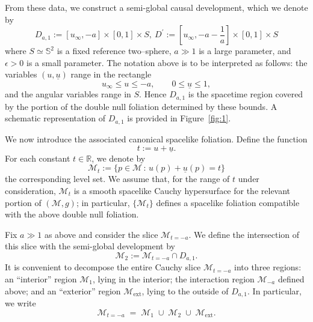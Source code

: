 \documentclass{amsart}
\newcommand{\ubar}{\underline{u}}
\begin{document}
\medskip

\noindent From these data, we construct a semi-global causal development, which we denote by
\[
D_{a,1} := [u_\infty,-a] \times [0,1] \times S,~D^{'}:=[u_{\infty},-a-\frac{1}{a}]\times [0,1]\times S
\]
where $S \simeq \mathbb{S}^2$ is a fixed reference two--sphere, $a \gg 1$ is a large parameter, and $\epsilon>0$ is a small parameter. 
The notation above is to be interpreted as follows: the variables $(u,\ubar)$ range in the rectangle
\[
u_\infty \le u \le -a,
\qquad
0 \le \ubar \le 1,
\]
and the angular variables range in $S$. 
Hence $D_{a,1}$ is the spacetime region covered by the portion of the double null foliation determined by these bounds. 
A schematic representation of $D_{a,1}$ is provided in Figure~\ref{fig:1}.

\medskip

\noindent We now introduce the associated canonical spacelike foliation. 
Define the function
\[
t := u + \ubar.
\]
For each constant $t \in \mathbb{R}$, we denote by
\[
\mathcal{M}_{t} := \{ p \in \mathcal{M} \,:\, u(p) + \ubar(p) = t \}
\]
the corresponding level set. 
We assume that, for the range of $t$ under consideration, $\mathcal{M}_{t}$ is a smooth spacelike Cauchy hypersurface 
for the relevant portion of $(\mathcal{M},g)$; in particular, $\{ \mathcal{M}_{t} \}$ defines a spacelike foliation compatible with the above double null foliation.

\medskip

\noindent Fix $a \gg 1$ as above and consider the slice $\mathcal{M}_{t=-a}$. 
We define the intersection of this slice with the semi-global development by
\[
\mathcal{M}_{2} 
:= 
\mathcal{M}_{t=-a} \cap D_{a,1}.
\]
It is convenient to decompose the entire Cauchy slice $\mathcal{M}_{t=-a}$ into three regions: 
an ``interior'' region $\mathcal{M}_{1}$, lying in the interior; 
the interaction region $\mathcal{M}_{-a}$ defined above; 
and an ``exterior'' region $\mathcal{M}_{\mathrm{ext}}$, lying to the outside of $D_{a,1}$. 
In particular, we write
\begin{equation}\label{eq:Cauchy-decomp}
    \mathcal{M}_{t=-a}
    \;=\;
    \mathcal{M}_{1}
    \;\cup\;
    \mathcal{M}_{2}
    \;\cup\;
    \mathcal{M}_{\mathrm{ext}}.
\end{equation}
\end{document}

